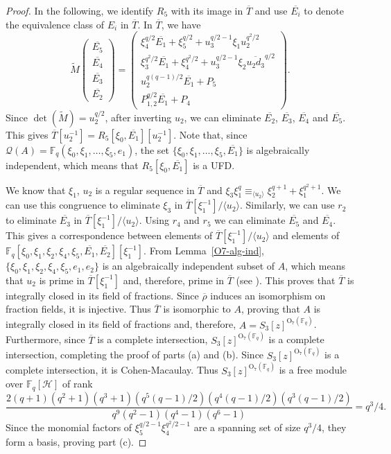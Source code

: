 \documentclass{amsart}
\newcommand{\field}{\mathbb{F}}
\newcommand{\orth}[2]{{{\text{O}_{{#1}}(\field_{#2})}}}
\newcommand{\FF}{\mathcal{Q}}
\renewcommand{\H}{\mathcal{H}}
\begin{document}
\begin{proof}
In  the following, we identify $R_5$ with its image in $\overline{T}$ and use $\overline{E_i}$ to denote the equivalence class of $E_i$ in $\overline{T}$.
In $\overline{T}$, we have
$$\widetilde{M} \begin{pmatrix} \overline{E_5}\\ \overline{E_4} \\ \overline{E_3} \\ \overline{E_2} \end{pmatrix} 
=\begin{pmatrix} \xi_4^{q/2}\overline{E_1}+\xi_5^{q/2}+u_3^{q/2-1}\xi_1u_2^{q^2/2}\\ 
\xi_3^{q^2/2}\overline{E_1}+\xi_4^{q^2/2}+u_3^{q/2-1}\xi_2\overline{u_2d_3}^{q/2} \\ 
u_2^{q(q-1)/2}\overline{E_1}+P_5 \\
P_{1,2}^{q/2} \overline{E_1}+P_4 \end{pmatrix} .$$
Since $\det(\widetilde{M})=u_2^{q/2}$, after inverting $u_2$, we can eliminate $\overline{E_2}$, $\overline{E_3}$, $\overline{E_4}$ and $\overline{E_5}$.
This gives $\overline{T}[u_2^{-1}]=R_5[\xi_0,\overline{E_1}][u_2^{-1}]$. Note that, since $\FF(A)=\field_q(\xi_0,\xi_1,\ldots,\xi_5,e_1)$,
the set $\{\xi_0,\xi_1,\ldots,\xi_5,\overline{E_1}\}$ is algebraically independent, which means that $R_5[\xi_0,\overline{E_1}]$ is a UFD.

We know that $\xi_1$, $u_2$ is a regular sequence in $\overline{T}$ and $\xi_3\xi_1^q\equiv_{\langle u_2\rangle} \xi_2^{q+1}+\xi_1^{q^2+1}$.
We can use this congruence to eliminate $\xi_3$ in $\overline{T}[\xi_1^{-1}]/\langle u_2\rangle$.
Similarly, we can use $r_2$ to eliminate $\overline{E_3}$ in $\overline{T}[\xi_1^{-1}]/\langle u_2\rangle$.
Using $r_4$ and $r_5$ we can eliminate $\overline{E_5}$ and $\overline{E_4}$. 
This gives a correspondence between elements of $\overline{T}[\xi_1^{-1}]/\langle u_2\rangle$ and
elements of $\field_q[\xi_0,\xi_1,\xi_2,\xi_4,\xi_5,\overline{E_1},\overline{E_2}][\xi_1^{-1}]$.
From Lemma~\ref{O7-alg-ind}, $\{\xi_0,\xi_1,\xi_2,\xi_4,\xi_5,e_1,e_2\}$ is an algebraically independent subset of $A$,
which means that $u_2$ is prime in $\overline{T}[\xi_1^{-1}]$ and, therefore, prime in $\overline{T}$ (see \cite[Proposition 1.1]{Kropholler+Rajaei+Segal:05}).
This proves that $\overline{T}$ is integrally closed in its field of fractions.
Since $\overline{\rho}$ induces an isomorphism on fraction fields, it is injective.
Thus $\overline{T}$ is isomorphic to $A$, proving that $A$ is integrally closed in its field of fractions and, therefore,
 $A=S_3[z]^{\orth{7}{q}}$. Furthermore, since $\overline{T}$ is a complete intersection, $S_3[z]^{\orth{7}{q}}$ is a complete intersection,
 completing the proof of parts (a) and (b). Since $S_3[z]^{\orth{7}{q}}$ is a complete intersection, it is Cohen-Macaulay. Thus 
 $S_3[z]^{\orth{7}{q}}$  is a free module over $\field_q[\H]$ of rank
 $$\frac{2(q+1)(q^2+1)(q^3+1)(q^5(q-1)/2)(q^4(q-1)/2)(q^3(q-1)/2)}{q^9(q^2-1)(q^4-1)(q^6-1)}=q^3/4.$$
 Since the monomial factors of $\xi_5^{q/2-1}\xi_4^{q^2/2-1}$ are a spanning set of size $q^3/4$, they form a basis, proving part (c).
\end{proof}
\end{document}
